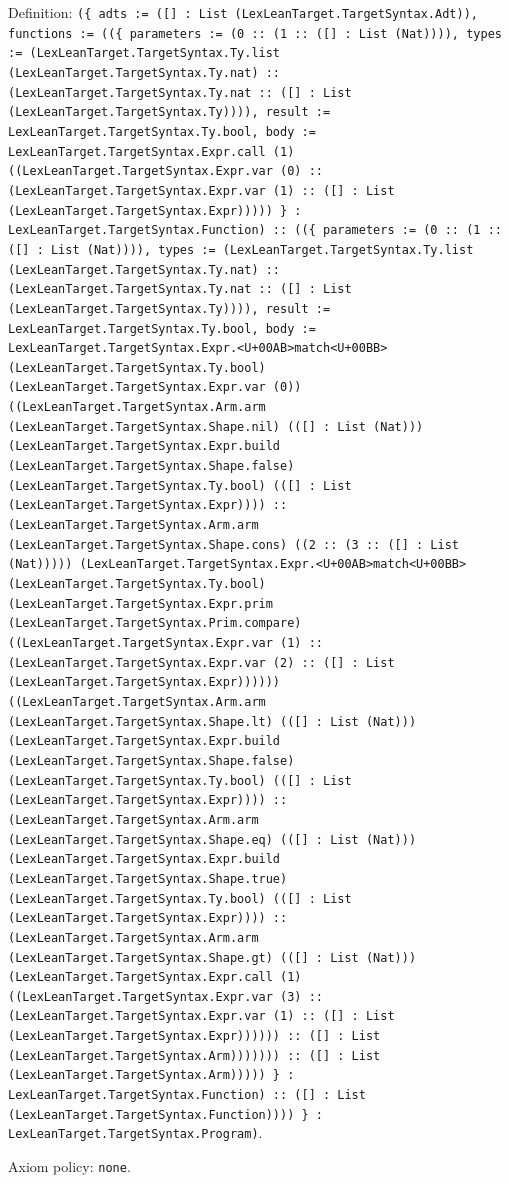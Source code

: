 \documentclass[11pt]{article}
\begin{document}
\noindent Definition: \texttt{(\{ adts := ([] : List (LexLeanTarget.TargetSyntax.Adt)), functions := ((\{ parameters := (0 :: (1 :: ([] : List (Nat)))), types := (LexLeanTarget.TargetSyntax.Ty.list (LexLeanTarget.TargetSyntax.Ty.nat) :: (LexLeanTarget.TargetSyntax.Ty.nat :: ([] : List (LexLeanTarget.TargetSyntax.Ty)))), result := LexLeanTarget.TargetSyntax.Ty.bool, body := LexLeanTarget.TargetSyntax.Expr.call (1) ((LexLeanTarget.TargetSyntax.Expr.var (0) :: (LexLeanTarget.TargetSyntax.Expr.var (1) :: ([] : List (LexLeanTarget.TargetSyntax.Expr))))) \} : LexLeanTarget.TargetSyntax.Function) :: ((\{ parameters := (0 :: (1 :: ([] : List (Nat)))), types := (LexLeanTarget.TargetSyntax.Ty.list (LexLeanTarget.TargetSyntax.Ty.nat) :: (LexLeanTarget.TargetSyntax.Ty.nat :: ([] : List (LexLeanTarget.TargetSyntax.Ty)))), result := LexLeanTarget.TargetSyntax.Ty.bool, body := LexLeanTarget.TargetSyntax.Expr.<U+00AB>match<U+00BB> (LexLeanTarget.TargetSyntax.Ty.bool) (LexLeanTarget.TargetSyntax.Expr.var (0)) ((LexLeanTarget.TargetSyntax.Arm.arm (LexLeanTarget.TargetSyntax.Shape.nil) (([] : List (Nat))) (LexLeanTarget.TargetSyntax.Expr.build (LexLeanTarget.TargetSyntax.Shape.false) (LexLeanTarget.TargetSyntax.Ty.bool) (([] : List (LexLeanTarget.TargetSyntax.Expr)))) :: (LexLeanTarget.TargetSyntax.Arm.arm (LexLeanTarget.TargetSyntax.Shape.cons) ((2 :: (3 :: ([] : List (Nat))))) (LexLeanTarget.TargetSyntax.Expr.<U+00AB>match<U+00BB> (LexLeanTarget.TargetSyntax.Ty.bool) (LexLeanTarget.TargetSyntax.Expr.prim (LexLeanTarget.TargetSyntax.Prim.compare) ((LexLeanTarget.TargetSyntax.Expr.var (1) :: (LexLeanTarget.TargetSyntax.Expr.var (2) :: ([] : List (LexLeanTarget.TargetSyntax.Expr)))))) ((LexLeanTarget.TargetSyntax.Arm.arm (LexLeanTarget.TargetSyntax.Shape.lt) (([] : List (Nat))) (LexLeanTarget.TargetSyntax.Expr.build (LexLeanTarget.TargetSyntax.Shape.false) (LexLeanTarget.TargetSyntax.Ty.bool) (([] : List (LexLeanTarget.TargetSyntax.Expr)))) :: (LexLeanTarget.TargetSyntax.Arm.arm (LexLeanTarget.TargetSyntax.Shape.eq) (([] : List (Nat))) (LexLeanTarget.TargetSyntax.Expr.build (LexLeanTarget.TargetSyntax.Shape.true) (LexLeanTarget.TargetSyntax.Ty.bool) (([] : List (LexLeanTarget.TargetSyntax.Expr)))) :: (LexLeanTarget.TargetSyntax.Arm.arm (LexLeanTarget.TargetSyntax.Shape.gt) (([] : List (Nat))) (LexLeanTarget.TargetSyntax.Expr.call (1) ((LexLeanTarget.TargetSyntax.Expr.var (3) :: (LexLeanTarget.TargetSyntax.Expr.var (1) :: ([] : List (LexLeanTarget.TargetSyntax.Expr)))))) :: ([] : List (LexLeanTarget.TargetSyntax.Arm))))))) :: ([] : List (LexLeanTarget.TargetSyntax.Arm))))) \} : LexLeanTarget.TargetSyntax.Function) :: ([] : List (LexLeanTarget.TargetSyntax.Function)))) \} : LexLeanTarget.TargetSyntax.Program)}.\par
\noindent Axiom policy: \texttt{none}.\par
\end{document}
